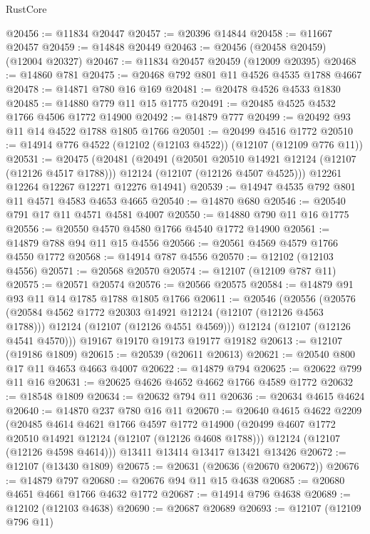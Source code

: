 \begin{lexlean}{RustCore}
\begin{coremodule}
@20456 := @11834 @20447
@20457 := @20396 @14844
@20458 := @11667 @20457
@20459 := @14848 @20449
@20463 := @20456 (@20458 @20459) (@12004 @20327)
@20467 := @11834 @20457 @20459 (@12009 @20395)
@20468 := @14860 @781
@20475 := @20468 @792 @801 @11 @4526 @4535 @1788 @4667
@20478 := @14871 @780 @16 @169
@20481 := @20478 @4526 @4533 @1830
@20485 := @14880 @779 @11 @15 @1775
@20491 := @20485 @4525 @4532 @1766 @4506 @1772 @14900
@20492 := @14879 @777
@20499 := @20492 @93 @11 @14 @4522 @1788 @1805 @1766
@20501 := @20499 @4516 @1772
@20510 := @14914 @776 @4522 (@12102 (@12103 @4522)) (@12107 (@12109 @776 @11))
@20531 := @20475
    (@20481
      (@20491
        (@20501 @20510 @14921 @12124 (@12107 (@12126 @4517 @1788)))
        @12124
        (@12107 (@12126 @4507 @4525)))
      @12261
      @12264
      @12267
      @12271
      @12276
      @14941)
@20539 := @14947 @4535 @792 @801 @11 @4571 @4583 @4653 @4665
@20540 := @14870 @680
@20546 := @20540 @791 @17 @11 @4571 @4581 @4007
@20550 := @14880 @790 @11 @16 @1775
@20556 := @20550 @4570 @4580 @1766 @4540 @1772 @14900
@20561 := @14879 @788 @94 @11 @15 @4556
@20566 := @20561 @4569 @4579 @1766 @4550 @1772
@20568 := @14914 @787 @4556
@20570 := @12102 (@12103 @4556)
@20571 := @20568 @20570
@20574 := @12107 (@12109 @787 @11)
@20575 := @20571 @20574
@20576 := @20566 @20575
@20584 := @14879 @91 @93 @11 @14 @1785 @1788 @1805 @1766
@20611 := @20546
    (@20556
      (@20576
        (@20584 @4562 @1772 @20303 @14921 @12124 (@12107 (@12126 @4563 @1788)))
        @12124
        (@12107 (@12126 @4551 @4569)))
      @12124
      (@12107 (@12126 @4541 @4570)))
    @19167
    @19170
    @19173
    @19177
    @19182
@20613 := @12107 (@19186 @1809)
@20615 := @20539 (@20611 @20613)
@20621 := @20540 @800 @17 @11 @4653 @4663 @4007
@20622 := @14879 @794
@20625 := @20622 @799 @11 @16
@20631 := @20625 @4626 @4652 @4662 @1766 @4589 @1772
@20632 := @18548 @1809
@20634 := @20632 @794 @11
@20636 := @20634 @4615 @4624
@20640 := @14870 @237 @780 @16 @11
@20670 := @20640
    @4615
    @4622
    @2209
    (@20485
      @4614
      @4621
      @1766
      @4597
      @1772
      @14900
      (@20499 @4607 @1772 @20510 @14921 @12124 (@12107 (@12126 @4608 @1788)))
      @12124
      (@12107 (@12126 @4598 @4614)))
    @13411
    @13414
    @13417
    @13421
    @13426
@20672 := @12107 (@13430 @1809)
@20675 := @20631 (@20636 (@20670 @20672))
@20676 := @14879 @797
@20680 := @20676 @94 @11 @15 @4638
@20685 := @20680 @4651 @4661 @1766 @4632 @1772
@20687 := @14914 @796 @4638
@20689 := @12102 (@12103 @4638)
@20690 := @20687 @20689
@20693 := @12107 (@12109 @796 @11)

\end{coremodule}
\end{lexlean}
